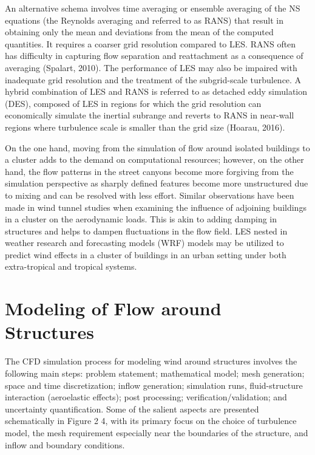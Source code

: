 An alternative schema involves time averaging or ensemble averaging of the NS equations (the Reynolds averaging and referred to as RANS) that result in obtaining only the mean and deviations from the mean of the computed quantities. It requires a coarser grid resolution compared to LES. RANS often has difficulty in capturing flow separation and reattachment as a consequence of averaging (Spalart, 2010). The performance of LES may also be impaired with inadequate grid resolution and the treatment of the subgrid-scale turbulence. A hybrid combination of LES and RANS is referred to as detached eddy simulation (DES), composed of LES in regions for which the grid resolution can economically simulate the inertial subrange and reverts to RANS in near-wall regions where turbulence scale is smaller than the grid size (Hoarau, 2016).

On the one hand, moving from the simulation of flow around isolated buildings to a cluster adds to the demand on computational resources; however, on the other hand, the flow patterns in the street canyons become more forgiving from the simulation perspective as sharply defined features become more unstructured due to mixing and can be resolved with less effort. Similar observations have been made in wind tunnel studies when examining the influence of adjoining buildings in a cluster on the aerodynamic loads. This is akin to adding damping in structures and helps to dampen fluctuations in the flow field. LES nested in weather research and forecasting models (WRF) models may be utilized to predict wind effects in a cluster of buildings in an urban setting under both extra-tropical and tropical systems. 

\section{Modeling of Flow around Structures}
\label{sec:resp_cfd_wind_flow_modeling}

The CFD simulation process for modeling wind around structures involves the following main steps: problem statement; mathematical model; mesh generation; space and time discretization; inflow generation; simulation runs, fluid-structure interaction (aeroelastic effects); post processing; verification/validation; and uncertainty quantification. Some of the salient aspects are presented schematically in Figure 2 4, with its primary focus on the choice of turbulence model, the mesh requirement especially near the boundaries of the structure, and inflow and boundary conditions.

